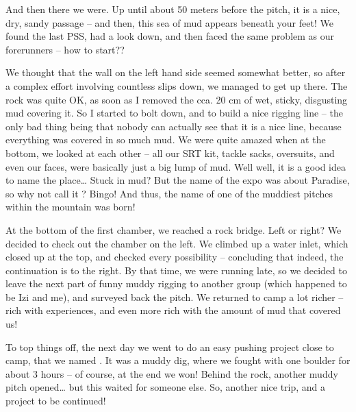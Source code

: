 And then there we were. Up until about 50 meters before the pitch, it is a
nice, dry, sandy passage -- and then, this sea of mud appears beneath
your feet! We found the last PSS, had a look down, and then faced the
same problem as our forerunners -- how to start??

We thought that the wall on the left hand side seemed somewhat better,
so after a complex effort involving countless slips down, we managed to
get up there. The rock was quite OK, as soon as I removed the cca. 20 cm
of wet, sticky, disgusting mud covering it. So I started to bolt down,
and to build a nice rigging line -- the only bad thing being that nobody
can actually see that it is a nice line, because everything was covered
in so much mud. We were quite amazed when at the bottom, we looked at
each other -- all our SRT kit, tackle sacks, oversuits, and even our
faces, were basically just a big lump of mud. Well well, it is a good
idea to name the place\ldots{} Stuck in mud? But the name of the expo
was about Paradise, so why not call it ? Bingo!
And thus, the name of one of the muddiest pitches within the mountain
was born!

At the bottom of the first chamber, we reached a rock bridge. Left or
right? We decided to check out the chamber on the left. We climbed up a
water inlet, which closed up at the top, and checked every possibility
-- concluding that indeed, the continuation is to the right. By that
time, we were running late, so we decided to leave the next part of
funny muddy rigging to another group (which happened to be Izi and me),
and surveyed back the pitch. We returned to camp a lot richer -- rich
with experiences, and even more rich with the amount of mud that covered
us!



To top things off, the next day we went to do an easy pushing
project close to camp, that we named . It was a muddy
dig, where we fought with one boulder for about 3 hours -- of course, at
the end we won! Behind the rock, another muddy pitch opened\ldots{} but
this waited for someone else. So, another nice trip, and a project to be
continued!

